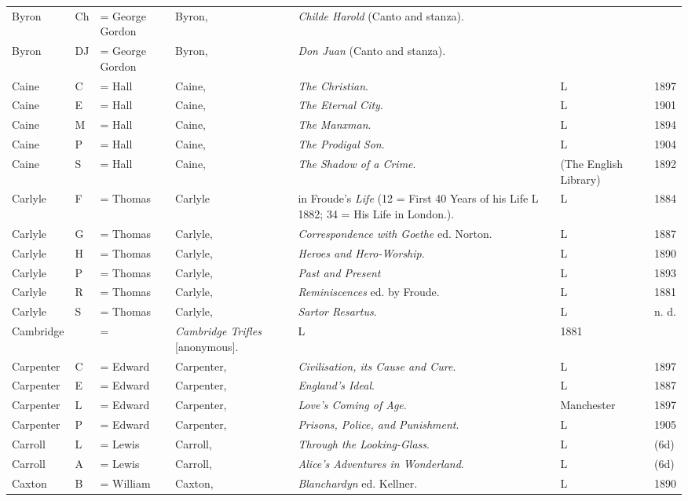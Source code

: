 \begin{sidewaystable}
\begin{tabular}{p{} p{} p{} p{} p{} p{} p{}}
Byron & Ch & = George Gordon & Byron, & \textit{Childe Harold} (Canto and stanza). & & \\
Byron & DJ & = George Gordon & Byron, & \textit{Don Juan} (Canto and stanza). & & \\
Caine & C & = Hall & Caine, & \textit{The Christian}. & L & 1897 \\
Caine & E & = Hall & Caine, & \textit{The Eternal City}. & L & 1901 \\
Caine & M & = Hall & Caine, & \textit{The Manxman}. & L & 1894 \\
Caine & P & = Hall & Caine, & \textit{The Prodigal Son}. & L & 1904 \\
Caine & S & = Hall & Caine, & \textit{The Shadow of a Crime}. & (The English Library) & 1892 \\
Carlyle & F & = Thomas & Carlyle & in Froude's \textit{Life} (12 = First 40 Years of his Life L 1882; 34 = His Life in London.). &L & 1884 \\
Carlyle & G & = Thomas & Carlyle, & \textit{Correspondence with Goethe} ed. Norton. & L & 1887 \\
Carlyle & H & = Thomas & Carlyle, & \textit{Heroes and Hero-Worship}. & L & 1890 \\
Carlyle & P & = Thomas & Carlyle, & \textit{Past and Present} & L & 1893 \\
Carlyle & R & = Thomas & Carlyle, & \textit{Reminiscences} ed. by Froude. & L & 1881 \\
Carlyle & S & = Thomas & Carlyle, & \textit{Sartor Resartus}. & L & n. d. \\
Cambridge & & = & \textit{Cambridge Trifles} [anonymous]. & L & 1881 \\
Carpenter & C & = Edward & Carpenter, & \textit{Civilisation, its Cause and Cure}. & L & 1897 \\
Carpenter & E & = Edward & Carpenter, & \textit{England's Ideal}. & L & 1887 \\
Carpenter & L & = Edward & Carpenter, & \textit{Love's Coming of Age}. & Manchester & 1897 \\
Carpenter & P & = Edward & Carpenter, & \textit{Prisons, Police, and Punishment}. & L & 1905 \\
Carroll & L & = Lewis & Carroll, & \textit{Through the Looking-Glass}. & L & (6d) \\
Carroll & A & = Lewis & Carroll, & \textit{Alice's Adventures in Wonderland}. & L & (6d) \\
Caxton & B & = William & Caxton, & \textit{Blanchardyn} ed. Kellner. & L & 1890 \\

\end{tabular}
\end{sidewaystable}
